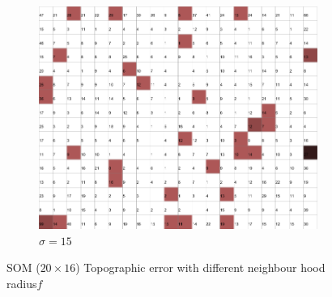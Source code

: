 \documentclass{acm_proc_article-sp}
\begin{document}
\begin{figure}
\begin{subfigure}[b]{0.30\linewidth}
    \end{subfigure}
    \begin{subfigure}[b]{0.30\linewidth}
        \includegraphics[width=\linewidth]{img/wine-newmid-topographic-error-sigma-15}
        \caption{$\sigma=15$}
        \label{fig:wine-newmid-topographic-error-sigma-15}
    \end{subfigure}
    \caption{SOM ($20\times16$) Topographic error with different neighbour hood radius$f$}
    \label{fig:wine-newmid-topographic-error-sigma}
\end{figure}
\end{document}
